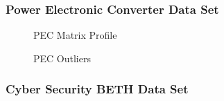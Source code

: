 \subsubsection{Power Electronic Converter Data Set}

\begin{figure}[H]
    \centering
    
    \caption{PEC Matrix Profile}
    \label{fig:pec_mp_hist}
\end{figure}
 
\begin{figure}[H]
    \centering
    
    \caption{PEC Outliers}
    \label{fig:pec_outliers}
\end{figure}

\subsubsection{Cyber Security BETH Data Set}

